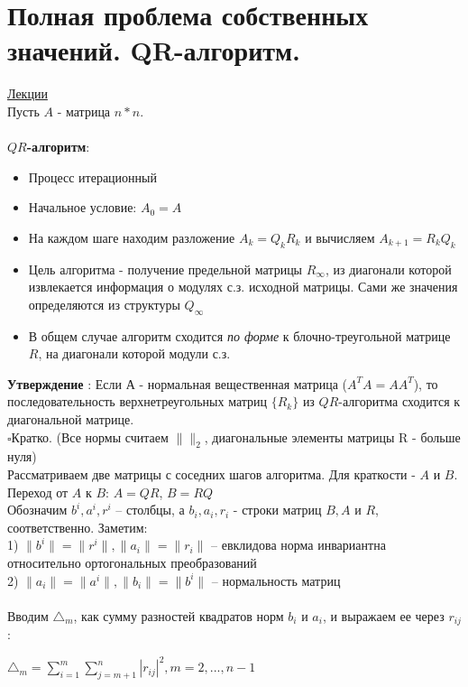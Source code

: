 \documentclass[specialist, subf, href, colorlinks=true, 12pt, times, mtpro, final]{disser}
\theoremstyle{definition}
\begin{document}
{    

\section {Полная проблема собственных значений. QR-алгоритм.}
    \hyperlink {lects.79}{Лекции}\\
    
Пусть $A$ - матрица $n*n$.
\\
\\
\textbf{$QR$-алгоритм}:
\begin{itemize}
\item Процесс итерационный
\item Начальное условие: $A_0 = A$
\item На каждом шаге находим разложение $A_k = Q_kR_k$ и  вычисляем $A_{k+1} = R_k Q_k $
\item Цель алгоритма - получение предельной матрицы $R_{\infty}$, из диагонали которой извлекается информация о  модулях с.з. исходной матрицы. Сами же значения определяются из структуры $Q_{\infty}$

\item В общем случае алгоритм сходится \textit{по форме} к блочно-треугольной матрице $R$, на диагонали которой модули с.з.
\end{itemize}
\textbf{Утверждение }:
Если $А$ - нормальная вещественная матрица ($A^TA = AA^T$), то последовательность верхнетреугольных матриц $\{R_k\}$ из $QR$-алгоритма сходится к диагональной матрице.
\\
$\square$Кратко. (Все нормы считаем $\|\|_2$, диагональные элементы матрицы R - больше нуля)\\

Рассматриваем две матрицы с соседних шагов алгоритма. Для краткости - $A$ и $B$. \\
Переход от $A$ к $B$: $A = QR$, $B = RQ$\\

Обозначим $b^i, a^i, r^i$ \--- столбцы, а $b_i, a_i, r_i$ - строки матриц $B, A$ и $R$, соответственно. 
Заметим:\\
1) $\|b^i\| = \|r^i\|, \|a_i\| = \|r_i\|$ \--- евклидова норма инвариантна относительно ортогональных преобразований\\
2) $\|a_i\| = \|a^i\|, \|b_i\| = \|b^i\|$ \--- нормальность матриц\\
\\
Вводим $\triangle_m$, как сумму разностей квадратов норм $b_i$ и $a_i$, и выражаем ее через $r_{ij}$:
\begin{center}
$\triangle_m = \sum\limits^m_{i=1} \sum\limits^n_{j=m+1} |r_{ij}|^2, m =2, ... , n-1$
\end{center}

}
\end{document}
